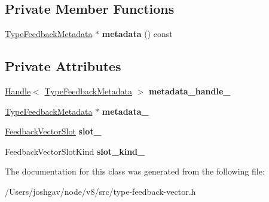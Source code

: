 \subsection*{Private Member Functions}
\begin{DoxyCompactItemize}
\item 
\hyperlink{classv8_1_1internal_1_1_type_feedback_metadata}{Type\+Feedback\+Metadata} $\ast$ {\bfseries metadata} () const \hypertarget{classv8_1_1internal_1_1_type_feedback_metadata_iterator_a5412d2fba5e6ea6f62df0ee7b45e83b2}{}\label{classv8_1_1internal_1_1_type_feedback_metadata_iterator_a5412d2fba5e6ea6f62df0ee7b45e83b2}

\end{DoxyCompactItemize}
\subsection*{Private Attributes}
\begin{DoxyCompactItemize}
\item 
\hyperlink{classv8_1_1internal_1_1_handle}{Handle}$<$ \hyperlink{classv8_1_1internal_1_1_type_feedback_metadata}{Type\+Feedback\+Metadata} $>$ {\bfseries metadata\+\_\+handle\+\_\+}\hypertarget{classv8_1_1internal_1_1_type_feedback_metadata_iterator_a10ff2ae6501f0928d6aa6f2d1dd10d8c}{}\label{classv8_1_1internal_1_1_type_feedback_metadata_iterator_a10ff2ae6501f0928d6aa6f2d1dd10d8c}

\item 
\hyperlink{classv8_1_1internal_1_1_type_feedback_metadata}{Type\+Feedback\+Metadata} $\ast$ {\bfseries metadata\+\_\+}\hypertarget{classv8_1_1internal_1_1_type_feedback_metadata_iterator_a518a8c28b6e0d5d6e7ad325448a8d783}{}\label{classv8_1_1internal_1_1_type_feedback_metadata_iterator_a518a8c28b6e0d5d6e7ad325448a8d783}

\item 
\hyperlink{classv8_1_1internal_1_1_feedback_vector_slot}{Feedback\+Vector\+Slot} {\bfseries slot\+\_\+}\hypertarget{classv8_1_1internal_1_1_type_feedback_metadata_iterator_af59a2e6029a4c708b31dbcee9bae9bd9}{}\label{classv8_1_1internal_1_1_type_feedback_metadata_iterator_af59a2e6029a4c708b31dbcee9bae9bd9}

\item 
Feedback\+Vector\+Slot\+Kind {\bfseries slot\+\_\+kind\+\_\+}\hypertarget{classv8_1_1internal_1_1_type_feedback_metadata_iterator_a84dc10485286f8979336a1fe320b9663}{}\label{classv8_1_1internal_1_1_type_feedback_metadata_iterator_a84dc10485286f8979336a1fe320b9663}

\end{DoxyCompactItemize}


The documentation for this class was generated from the following file\+:\begin{DoxyCompactItemize}
\item 
/\+Users/joshgav/node/v8/src/type-\/feedback-\/vector.\+h\end{DoxyCompactItemize}
